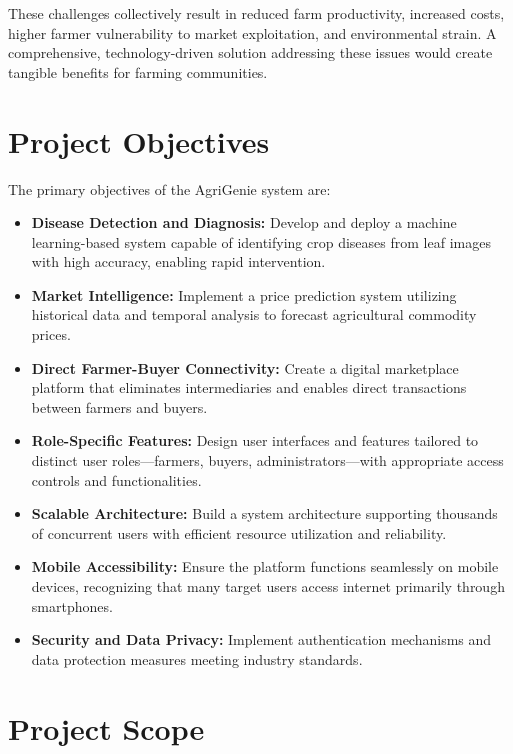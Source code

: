 \documentclass[12pt,a4paper]{report}
\begin{document}
These challenges collectively result in reduced farm productivity, increased costs, higher farmer vulnerability to market exploitation, and environmental strain. A comprehensive, technology-driven solution addressing these issues would create tangible benefits for farming communities.

\section{Project Objectives}

The primary objectives of the AgriGenie system are:

\begin{itemize}
    \item \textbf{Disease Detection and Diagnosis:} Develop and deploy a machine learning-based system capable of identifying crop diseases from leaf images with high accuracy, enabling rapid intervention.
    
    \item \textbf{Market Intelligence:} Implement a price prediction system utilizing historical data and temporal analysis to forecast agricultural commodity prices.
    
    \item \textbf{Direct Farmer-Buyer Connectivity:} Create a digital marketplace platform that eliminates intermediaries and enables direct transactions between farmers and buyers.
    
    \item \textbf{Role-Specific Features:} Design user interfaces and features tailored to distinct user roles---farmers, buyers, administrators---with appropriate access controls and functionalities.
    
    \item \textbf{Scalable Architecture:} Build a system architecture supporting thousands of concurrent users with efficient resource utilization and reliability.
    
    \item \textbf{Mobile Accessibility:} Ensure the platform functions seamlessly on mobile devices, recognizing that many target users access internet primarily through smartphones.
    
    \item \textbf{Security and Data Privacy:} Implement authentication mechanisms and data protection measures meeting industry standards.
\end{itemize}

\section{Project Scope}
\end{document}
